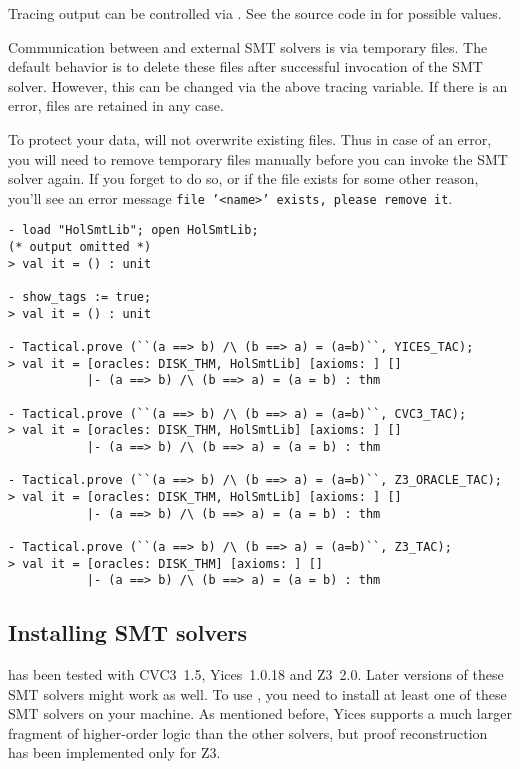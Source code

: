 Tracing output can be controlled via .  See the source code in  for
possible values.

Communication between \HOL{} and external SMT solvers is via temporary
files.  The default behavior is to delete these files after successful
invocation of the SMT solver.  However, this can be changed via the
above tracing variable.  If there is an error, files are retained in
any case.

To protect your data,  will not overwrite existing
files.  Thus in case of an error, you will need to remove temporary
files manually before you can invoke the SMT solver again.  If you
forget to do so, or if the file exists for some other reason, you'll
see an error message \texttt{file '<name>' exists, please remove it}.

\begin{session}
\begin{verbatim}
- load "HolSmtLib"; open HolSmtLib;
(* output omitted *)
> val it = () : unit

- show_tags := true;
> val it = () : unit

- Tactical.prove (``(a ==> b) /\ (b ==> a) = (a=b)``, YICES_TAC);
> val it = [oracles: DISK_THM, HolSmtLib] [axioms: ] []
           |- (a ==> b) /\ (b ==> a) = (a = b) : thm

- Tactical.prove (``(a ==> b) /\ (b ==> a) = (a=b)``, CVC3_TAC);
> val it = [oracles: DISK_THM, HolSmtLib] [axioms: ] []
           |- (a ==> b) /\ (b ==> a) = (a = b) : thm

- Tactical.prove (``(a ==> b) /\ (b ==> a) = (a=b)``, Z3_ORACLE_TAC);
> val it = [oracles: DISK_THM, HolSmtLib] [axioms: ] []
           |- (a ==> b) /\ (b ==> a) = (a = b) : thm

- Tactical.prove (``(a ==> b) /\ (b ==> a) = (a=b)``, Z3_TAC);
> val it = [oracles: DISK_THM] [axioms: ] []
           |- (a ==> b) /\ (b ==> a) = (a = b) : thm
\end{verbatim}
\end{session}

\subsection{Installing SMT solvers}

 has been tested with CVC3~1.5, Yices~1.0.18 and Z3~2.0.
Later versions of these SMT solvers might work as well.  To use
, you need to install at least one of these SMT solvers
on your machine.  As mentioned before, Yices supports a much larger
fragment of higher-order logic than the other solvers, but proof
reconstruction has been implemented only for Z3.

